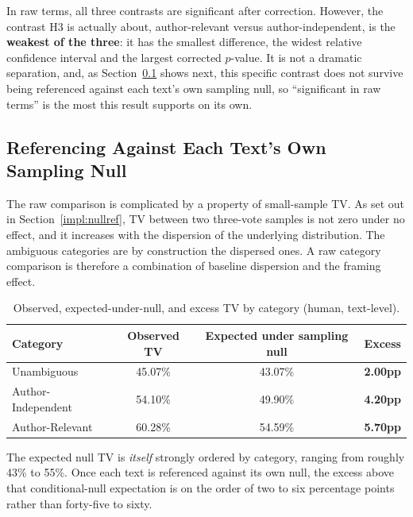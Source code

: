 \noindent
In raw terms, all three contrasts are significant after correction. However, the contrast H3 is
actually about, author-relevant versus author-independent, is the \textbf{weakest of the three}:
it has the smallest difference, the widest relative confidence interval and the largest corrected
$p$-value. It is not a dramatic separation, and, as Section~\ref{res:h3null} shows next, this
specific contrast does not survive being referenced against each text's own sampling null, so
``significant in raw terms'' is the most this result supports on its own.

\subsection{Referencing Against Each Text's Own Sampling Null}
\label{res:h3null}

\noindent
The raw comparison is complicated by a property of small-sample TV. As set out in
Section~\ref{impl:nullref}, TV between two three-vote samples is not zero under no effect, and it
increases with the dispersion of the underlying distribution. The ambiguous categories are by
construction the dispersed ones. A raw category comparison is therefore a combination of baseline
dispersion and the framing effect.

\begin{table}[h]
\centering
\footnotesize
\caption{Observed, expected-under-null, and excess TV by category (human, text-level).}
\label{tab:h3excess}
\begin{tabular}{lccc}
\hline
\textbf{Category} & \textbf{Observed TV} & \textbf{Expected under sampling null} & \textbf{Excess} \\
\hline
Unambiguous & 45.07\% & 43.07\% & \textbf{2.00pp} \\
Author-Independent & 54.10\% & 49.90\% & \textbf{4.20pp} \\
Author-Relevant & 60.28\% & 54.59\% & \textbf{5.70pp} \\
\hline
\end{tabular}
\end{table}

\noindent
The expected null TV is \emph{itself} strongly ordered by category, ranging from roughly 43\% to
55\%. Once each text is referenced against its own null, the excess above that conditional-null
expectation is on the order of two to six percentage points rather than forty-five to sixty.

